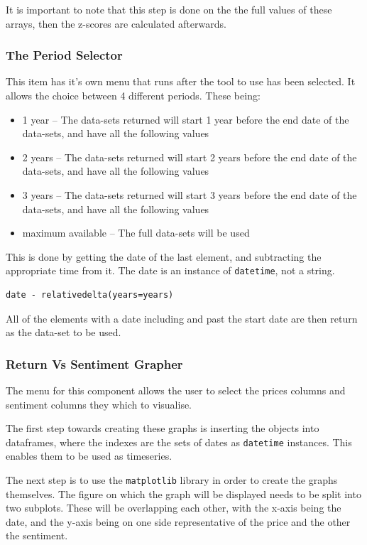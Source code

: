 It is important to note that this step is done on the the full values of these arrays, then the z-scores are calculated afterwards.

\subsubsection{The Period Selector}

This item has it's own menu that runs after the tool to use has been selected. It allows the choice between 4 different periods. These being:
\begin{itemize}
    \item 1 year -- The data-sets returned will start 1 year before the end date of the data-sets, and have all the following values
    \item 2 years -- The data-sets returned will start 2 years before the end date of the data-sets, and have all the following values
    \item 3 years -- The data-sets returned will start 3 years before the end date of the data-sets, and have all the following values
    \item maximum available -- The full data-sets will be used
\end{itemize}
This is done by getting the date of the last element, and subtracting the appropriate time from it. The date is an instance of \verb|datetime|, not a string.
\begin{lstlisting}[caption=Subtract years]
date - relativedelta(years=years)    
\end{lstlisting}
All of the elements with a date including and past the start date are then return as the data-set to be used.

\subsubsection{Return Vs Sentiment Grapher}

The menu for this component allows the user to select the prices columns and sentiment columns they which to visualise.

The first step towards creating these graphs is inserting the objects into dataframes, where the indexes are the sets of dates as \verb|datetime| instances. This enables them to be used as timeseries.

The next step is to use the \verb|matplotlib| library in order to create the graphs themselves. The figure on which the graph will be displayed needs to be split into two subplots. These will be overlapping each other, with the x-axis being the date, and the y-axis being on one side representative of the price and the other the sentiment.

